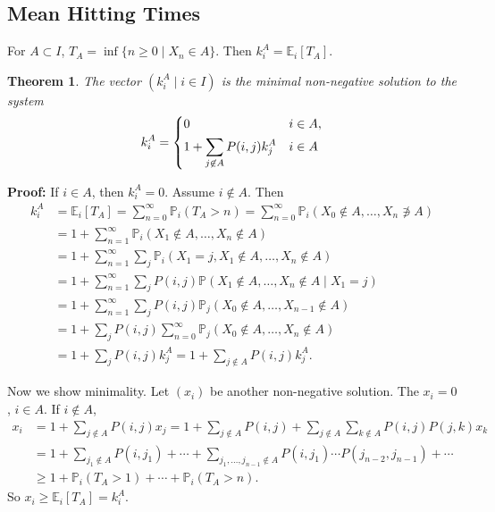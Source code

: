 \documentclass[12pt]{article}
\newtheorem{theorem}{Theorem}[section]
\theoremstyle{definition}
\theoremstyle{remark}
\begin{document}
\subsection{Mean Hitting Times}%
\label{sub:mean_hitting_times}

For $A \subset I$, $T_A = \inf\{n \geq 0 \mid X_n \in A\}$. Then $k^{A}_i = \mathbb{E}_i[T_A]$.

\begin{theorem}
	The vector $(k_i^{A} \mid i \in I)$ is the minimal non-negative solution to the system
	\[
	k_i^{A} =
	\begin{dcases}
		0 & i \in A, \\
		1 + \sum_{j \not \in A}P(i, j) k_j^{A} & i \in A
	\end{dcases}
	\]
\end{theorem}

\begin{adjustbox}{minipage = \columnwidth - 25.5pt, margin=1em, frame=1pt, margin=0em}
\textbf{Proof:} If $i \in A$, then $k_i^{A} = 0$. Assume $i \not \in A$. Then
\begin{align*}
	k_i^{A} &= \mathbb{E}_i[T_A] = \sum_{n = 0}^{\infty} \mathbb{P}_i (T_A > n) = \sum_{n = 0}^{\infty}\mathbb{P}_i(X_0 \not \in A, \ldots, X_n \not \ni A) \\
		&= 1 + \sum_{n = 1}^{\infty} \mathbb{P}_i(X_1 \not \in A, \ldots, X_n \not \in A) \\
		&= 1 + \sum_{n = 1}^{\infty} \sum_{j} \mathbb{P}_i(X_1 = j, X_1 \not \in A, \ldots, X_n \not \in A) \\
		&= 1 + \sum_{n = 1}^{\infty} \sum_{j} P(i, j) \mathbb{P}(X_1 \not \in A, \ldots, X_n \not \in A \mid X_1 = j) \\
		&= 1 + \sum_{n = 1}^{\infty} \sum_{j} P(i, j) \mathbb{P}_j(X_0 \not \in A, \ldots, X_{n-1} \not \in A) \\
		&= 1 + \sum_{j} P(i, j) \sum_{n = 0}^{\infty} \mathbb{P}_j(X_0 \not \in A, \ldots, X_n \not \in A) \\
		&= 1 + \sum_{j}P(i,j) k_j^{A} = 1 + \sum_{j \not \in A}P(i, j) k_{j}^{A}.
\end{align*}
\end{adjustbox}

\begin{adjustbox}{minipage = \columnwidth - 25.5pt, margin=1em, frame=1pt, margin=0em}
Now we show minimality. Let $(x_i)$ be another non-negative solution. The $x_i = 0$, $i \in A$. If $i \not \in A$,
\begin{align*}
	x_i &= 1 + \sum_{j \not \in A}P(i, j) x_j = 1 + \sum_{j \not \in A}P(i, j) + \sum_{j \not \in A}\sum_{k \not \in A}P(i, j) P(j, k) x_k \\
	    &=1 + \sum_{j_1 \not \in A}P(i, j_1) + \cdots + \sum_{j_1, \ldots, j_{n-1} \not \in A} P(i, j_1) \cdots P(j_{n-2}, j_{n-1}) + \cdots \\
	    &\geq 1 + \mathbb{P}_i(T_A > 1) + \cdots + \mathbb{P}_i(T_A > n).
\end{align*}
So $x_i \geq \mathbb{E}_i[T_A] = k_i^{A}$.

\end{adjustbox}
\end{document}
